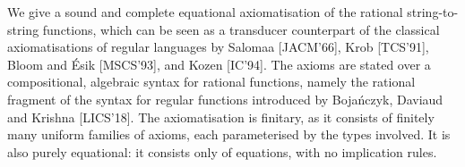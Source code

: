 We give a sound and complete equational axiomatisation of the rational string-to-string functions, which can be seen as a transducer counterpart of the classical axiomatisations of regular languages by Salomaa [JACM'66], Krob [TCS'91], Bloom and {\'E}sik [MSCS'93], and Kozen [IC'94]. The axioms are stated over a compositional, algebraic syntax for rational functions, namely the rational fragment of the syntax for regular functions introduced by Boja\'nczyk, Daviaud and Krishna [LICS'18]. The axiomatisation is finitary, as it consists of finitely many uniform families of axioms, each parameterised by the types involved. It is also purely equational: it consists only of equations, with no implication rules.